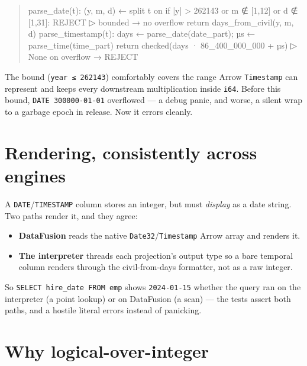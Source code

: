 \documentclass[
  11pt,
  openany]{book}
\newenvironment{Shaded}{}{}
\newcommand{\NormalTok}[1]{#1}
\providecommand{\tightlist}{%
  \setlength{\itemsep}{0pt}\setlength{\parskip}{0pt}}
\begin{document}
\begin{quote}
\begin{Shaded}
\begin{Highlighting}[]
\NormalTok{parse\_date(t):}
\NormalTok{  (y, m, d) ← split t on \textquotesingle{}{-}\textquotesingle{}}
\NormalTok{  if |y| \textgreater{} 262143 or m ∉ [1,12] or d ∉ [1,31]: REJECT   ▷ bounded → no overflow}
\NormalTok{  return days\_from\_civil(y, m, d)}
\NormalTok{parse\_timestamp(t):}
\NormalTok{  days ← parse\_date(date\_part);  µs ← parse\_time(time\_part)}
\NormalTok{  return checked(days · 86\_400\_000\_000 + µs)            ▷ None on overflow → REJECT}
\end{Highlighting}
\end{Shaded}
\end{quote}

The bound (\texttt{\textbar{}year\textbar{}\ ≤\ 262143}) comfortably
covers the range Arrow \texttt{Timestamp} can represent and keeps every
downstream multiplication inside \texttt{i64}. Before this bound,
\texttt{DATE\ \textquotesingle{}300000-01-01\textquotesingle{}}
overflowed --- a debug panic, and worse, a silent wrap to a garbage
epoch in release. Now it errors cleanly.

\section{Rendering, consistently across
engines}\label{rendering-consistently-across-engines}

A \texttt{DATE}/\texttt{TIMESTAMP} column stores an integer, but must
\emph{display} as a date string. Two paths render it, and they agree:

\begin{itemize}
\tightlist
\item
  \textbf{DataFusion} reads the native
  \texttt{Date32}/\texttt{Timestamp} Arrow array and renders it.
\item
  \textbf{The interpreter} threads each projection's output type so a
  bare temporal column renders through the civil-from-days formatter,
  not as a raw integer.
\end{itemize}

So \texttt{SELECT\ hire\_date\ FROM\ emp} shows \texttt{2024-01-15}
whether the query ran on the interpreter (a point lookup) or on
DataFusion (a scan) --- the tests assert both paths, and a hostile
literal errors instead of panicking.

\section{Why logical-over-integer}\label{why-logical-over-integer}
\end{document}
